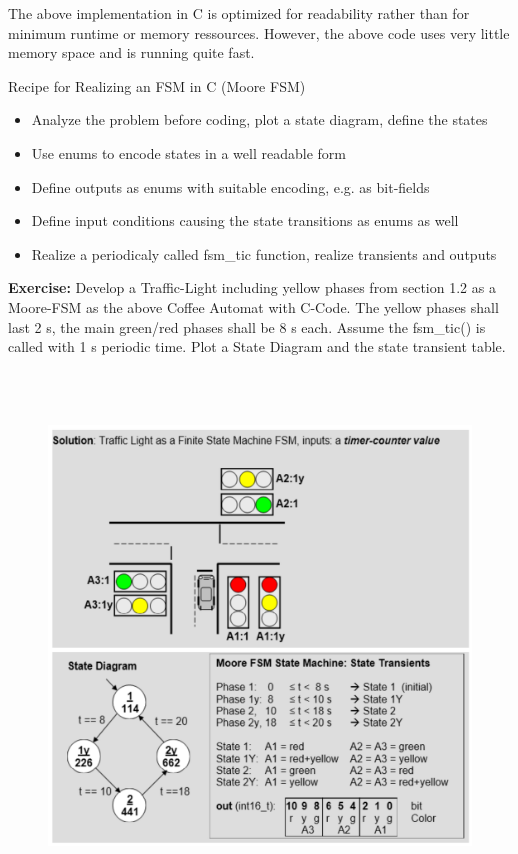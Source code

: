 The above implementation in C is optimized for readability rather than for minimum runtime or memory ressources. However, the above code uses very little memory space and is running quite fast.

\begin{tcolorbox}[colback=blue!5!white,colframe=blue!75!black]
Recipe for Realizing an FSM in C  (Moore FSM)
\begin{itemize}
\item Analyze the problem before coding, plot a state diagram, define the states
\item Use enums to encode states in a well readable form
\end{itemize}
\end{tcolorbox}

\begin{itemize}
\item Define outputs as enums with suitable encoding, e.g. as bit-fields
\item Define input conditions causing the state transitions as enums as well
\item Realize a periodicaly called fsm\_tic function, realize transients and outputs
\end{itemize}
\newpage

\textbf{Exercise:} Develop a Traffic-Light including yellow phases from section 1.2 as a Moore-FSM as the above Coffee Automat with C-Code. The yellow phases shall last 2 s, the main green/red phases shall be 8 s each. Assume the fsm\_tic() is called with 1 s periodic time. Plot a State Diagram and the state transient table.

	\begin{figure}[h]
    \centering
    \includegraphics[width=15cm, height=14cm]{Images/image159.png}
    \label{fig:Fig }
    \end{figure}

